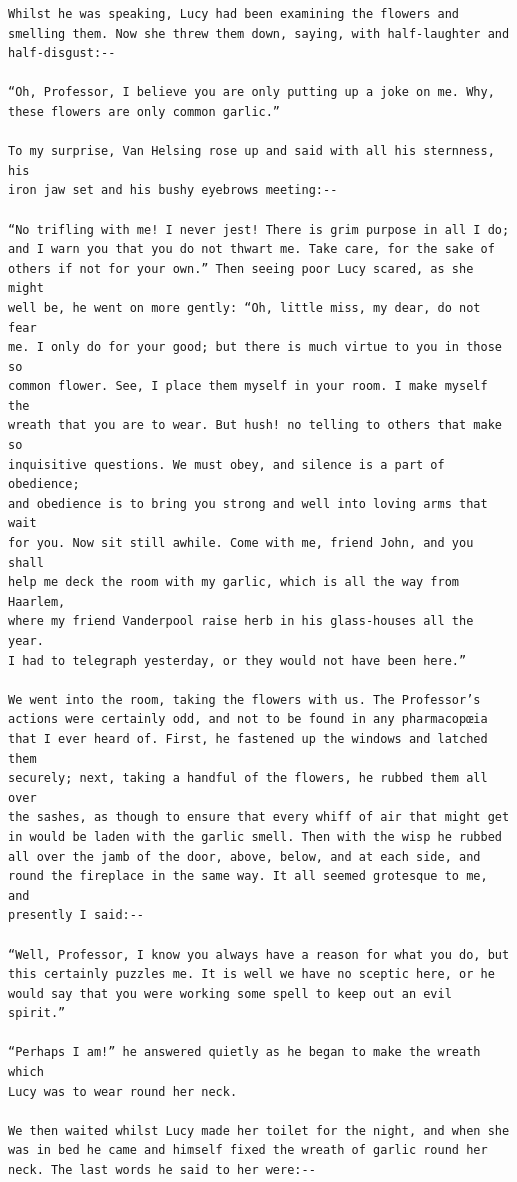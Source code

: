\documentclass{article}
\begin{document}
\begin{verbatim}
Whilst he was speaking, Lucy had been examining the flowers and
smelling them. Now she threw them down, saying, with half-laughter and
half-disgust:--

“Oh, Professor, I believe you are only putting up a joke on me. Why,
these flowers are only common garlic.”

To my surprise, Van Helsing rose up and said with all his sternness, his
iron jaw set and his bushy eyebrows meeting:--

“No trifling with me! I never jest! There is grim purpose in all I do;
and I warn you that you do not thwart me. Take care, for the sake of
others if not for your own.” Then seeing poor Lucy scared, as she might
well be, he went on more gently: “Oh, little miss, my dear, do not fear
me. I only do for your good; but there is much virtue to you in those so
common flower. See, I place them myself in your room. I make myself the
wreath that you are to wear. But hush! no telling to others that make so
inquisitive questions. We must obey, and silence is a part of obedience;
and obedience is to bring you strong and well into loving arms that wait
for you. Now sit still awhile. Come with me, friend John, and you shall
help me deck the room with my garlic, which is all the way from Haarlem,
where my friend Vanderpool raise herb in his glass-houses all the year.
I had to telegraph yesterday, or they would not have been here.”

We went into the room, taking the flowers with us. The Professor’s
actions were certainly odd, and not to be found in any pharmacopœia
that I ever heard of. First, he fastened up the windows and latched them
securely; next, taking a handful of the flowers, he rubbed them all over
the sashes, as though to ensure that every whiff of air that might get
in would be laden with the garlic smell. Then with the wisp he rubbed
all over the jamb of the door, above, below, and at each side, and
round the fireplace in the same way. It all seemed grotesque to me, and
presently I said:--

“Well, Professor, I know you always have a reason for what you do, but
this certainly puzzles me. It is well we have no sceptic here, or he
would say that you were working some spell to keep out an evil spirit.”

“Perhaps I am!” he answered quietly as he began to make the wreath which
Lucy was to wear round her neck.

We then waited whilst Lucy made her toilet for the night, and when she
was in bed he came and himself fixed the wreath of garlic round her
neck. The last words he said to her were:--


\end{verbatim}
\end{document}
